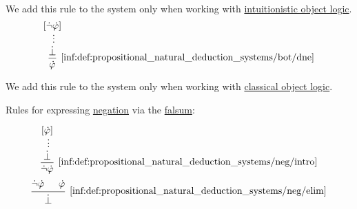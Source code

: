 \begin{definition}
\begin{thmenum}
\begin{TwoColumns}
      We add this rule to the system only when working with \hyperref[def:intuitionistic_logic]{intuitionistic object logic}.
    \BeginSecondColumn
      \begin{equation*}\taglabel[\logic{DNE}]{inf:def:propositional_natural_deduction_systems/bot/dne}
        \begin{prooftree}
          \hypo{ [\synneg \syn\varphi] }
          \ellipsis {} { \synbot }
          \infer1[\ref{inf:def:propositional_natural_deduction_systems/bot/dne}]{ \syn\varphi }
        \end{prooftree}
      \end{equation*}

      We add this rule to the system only when working with \hyperref[def:classical_logic]{classical object logic}.
    \end{TwoColumns}

     Rules for expressing \hyperref[def:propositional_alphabet/negation]{negation} via the \hyperref[def:propositional_alphabet/constants/falsum]{falsum}:
    \begin{TwoColumns}
      \begin{equation*}\taglabel[\( \neg^+ \)]{inf:def:propositional_natural_deduction_systems/neg/intro}
        \begin{prooftree}
          \hypo{ [\syn\varphi] }
          \ellipsis {} { \synbot }
          \infer1[\ref{inf:def:propositional_natural_deduction_systems/neg/intro}]{ \synneg \syn\varphi }
        \end{prooftree}
      \end{equation*}
    \BeginSecondColumn
      \begin{equation*}\taglabel[\( \neg^- \)]{inf:def:propositional_natural_deduction_systems/neg/elim}
        \begin{prooftree}
          \hypo{ \synneg \syn\varphi }
          \hypo{ \syn\varphi }
          \infer2[\ref{inf:def:propositional_natural_deduction_systems/neg/elim}]{ \synbot }
        \end{prooftree}
      \end{equation*}
    \end{TwoColumns}


\end{thmenum}
\end{definition}
